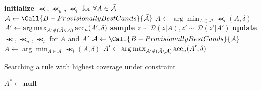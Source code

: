 \documentclass[aspectratio=169]{slide-en}
\begin{document}
\begin{frame}
  \begin{algorithm}[H]
    \small
    \caption{%
      Searching rules with highest accuracy (KL-LUCB~\cite{kaufmann2013information})
    }
    \begin{algorithmic}[1]
      \State\textbf{initialize} $\Prec,\Prec_{u},\Prec_{l}$ for $\forall A\in\bar{\mathcal{A}}$
      \State$\mathcal{A}\gets\Call{B-ProvisionallyBestCands}{\cands}$
      \State$A\gets\arg\min_{A\in\mathcal{A}}\Prec_{l}(A,\delta)$
      \State$A'\gets\arg\max_{A'\notin(\bar{\mathcal{A}}\setminus\mathcal{A})}\operatorname{acc}_{u}(A',\delta)$
      \State\textbf{sample} $z\sim\mathcal{D}(z|A),z'\sim\mathcal{D}(z'|A')$
      \State\textbf{update} $\Prec,\Prec_{u},\Prec_{l}$ for $A$ and $A'$
      \State$\mathcal{A}\gets\Call{B-ProvisionallyBestCands}{\cands}$
      \State$A\gets\arg\min_{A\in\mathcal{A}}\Prec_{l}(A,\delta)$
      \State$A'\gets\arg\max_{A'\notin(\bar{\mathcal{A}}\setminus\mathcal{A})}\operatorname{acc}_{u}(A',\delta)$
      \EndWhile%
      \State{}
      \EndFunction%
    \end{algorithmic}
  \end{algorithm}
\end{frame}

\begin{frame}
  \begin{algorithm}[H]
    \caption{Searching a rule with highest coverage under constraint}
    \begin{algorithmic}[1]
      \State$A^*\gets\textbf{null}$
      \EndFor%
      \State{}
      \EndFunction%
    \end{algorithmic}
  \end{algorithm}
\end{frame}
\end{document}
